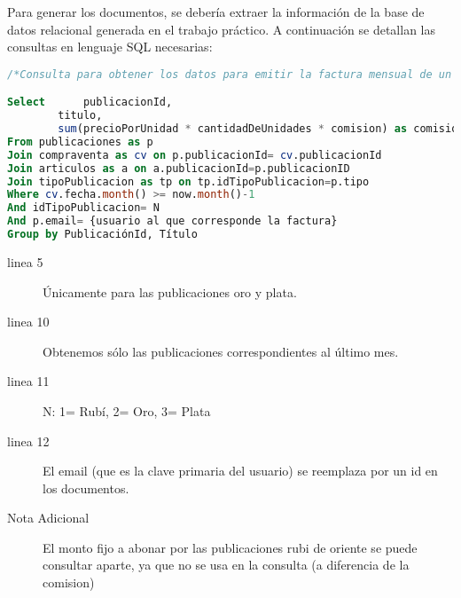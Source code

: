 Para generar los documentos, se debería extraer la información de la base de datos relacional generada en el trabajo práctico.
A continuación se detallan las consultas en lenguaje SQL necesarias:

  \begin{lstlisting}[language=SQL]
/*Consulta para obtener los datos para emitir la factura mensual de un usuario*/

Select		publicacionId,
		titulo,
		sum(precioPorUnidad * cantidadDeUnidades * comision) as comision
From publicaciones as p 
Join compraventa as cv on p.publicacionId= cv.publicacionId 
Join articulos as a on a.publicacionId=p.publicacionID
Join tipoPublicacion as tp on tp.idTipoPublicacion=p.tipo 
Where cv.fecha.month() >= now.month()-1 
And idTipoPublicacion= N 
And p.email= {usuario al que corresponde la factura} 
Group by PublicaciónId, Título

  \end{lstlisting}
  \begin{description}
 \item[linea 5] Únicamente para las publicaciones oro y plata.
 \item[linea 10] Obtenemos sólo las publicaciones correspondientes al último mes.
 \item[linea 11] N: 1= Rubí, 2= Oro, 3= Plata
 \item[linea 12] El email (que es la clave primaria del usuario) se reemplaza por un id en los documentos.
 \item[Nota Adicional] El monto fijo a abonar por las publicaciones rubi de oriente se puede consultar aparte, ya que
 no se usa en la consulta (a diferencia de la comision)
  \end{description}

